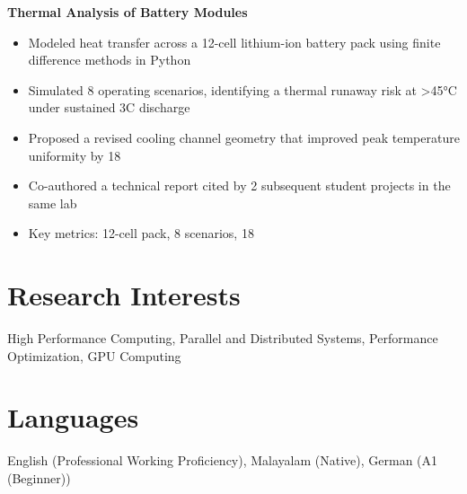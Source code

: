 \documentclass[11pt,a4paper]{article}
\begin{document}
\textbf{ Thermal Analysis of Battery Modules }
\begin{itemize}[leftmargin=*,nosep,topsep=2pt]
    
    \item Modeled heat transfer across a 12-cell lithium-ion battery pack using finite difference methods in Python
    
    \item Simulated 8 operating scenarios, identifying a thermal runaway risk at >45°C under sustained 3C discharge
    
    \item Proposed a revised cooling channel geometry that improved peak temperature uniformity by 18%
    
    \item Co-authored a technical report cited by 2 subsequent student projects in the same lab
    
    \item Key metrics: 12-cell pack, 8 scenarios, 18%
    
\end{itemize}


\section{Research Interests}
High Performance Computing, Parallel and Distributed Systems, Performance Optimization, GPU Computing

\section{Languages}
English (Professional Working Proficiency), Malayalam (Native), German (A1 (Beginner))
\end{document}
